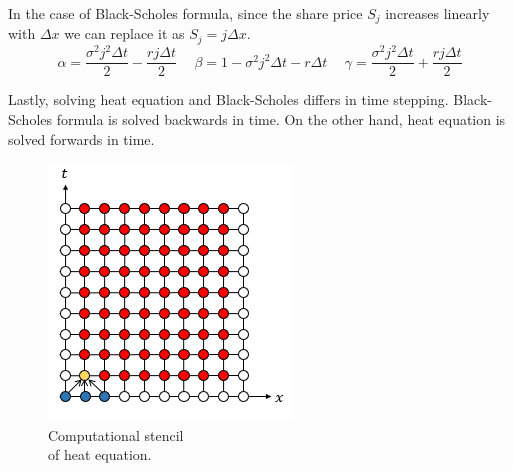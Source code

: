 \documentclass[12pt, oneside]{book}
\theoremstyle{plain}
\theoremstyle{definition}
\begin{document}
In the case of Black-Scholes formula, since the share price $S_j$ increases linearly with $\Delta x$ we can replace it as $S_j = j \Delta x$. 
\begin{equation}
\alpha =  \frac{\sigma^2 j^2 \Delta t}{2} - \frac{r j \Delta t}{2} \hspace{15pt} 
\beta = 1 - \sigma^2 j^2 \Delta t - r \Delta t \hspace{15pt} 
\gamma = \frac{\sigma^2 j^2 \Delta t}{2} + \frac{r j \Delta t}{2}
\end{equation}

Lastly, solving heat equation and Black-Scholes differs in time stepping. Black-Scholes formula is solved backwards in time. On the other hand, heat equation is solved forwards in time. 

\begin{figure}[!htb]
  \begin{minipage}[b]{0.5\textwidth}
    \includegraphics[width=\textwidth]{ExplicitHeat.png}
    \caption{Computational stencil \\of heat equation.}
  \end{minipage}
  \begin{minipage}[b]{0.5\textwidth}

\end{minipage}
\end{figure}
\end{document}
